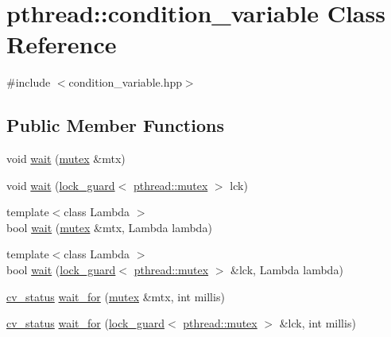 \hypertarget{classpthread_1_1condition__variable}{\section{pthread\+:\+:condition\+\_\+variable Class Reference}
\label{classpthread_1_1condition__variable}
}


{\ttfamily \#include $<$condition\+\_\+variable.\+hpp$>$}

\subsection*{Public Member Functions}
\begin{DoxyCompactItemize}
\item 
void \hyperlink{classpthread_1_1condition__variable_a34247dacb9da1856f3a65bc868b6abb8}{wait} (\hyperlink{classpthread_1_1mutex}{mutex} \&mtx)
\item 
void \hyperlink{classpthread_1_1condition__variable_a9bb3e49f17ec1470c305d8b21daadf2a}{wait} (\hyperlink{classpthread_1_1lock__guard}{lock\+\_\+guard}$<$ \hyperlink{classpthread_1_1mutex}{pthread\+::mutex} $>$ lck)
\item 
{\footnotesize template$<$class Lambda $>$ }\\bool \hyperlink{classpthread_1_1condition__variable_a251a506415355171be3052b68bc8d2ec}{wait} (\hyperlink{classpthread_1_1mutex}{mutex} \&mtx, Lambda lambda)
\item 
{\footnotesize template$<$class Lambda $>$ }\\bool \hyperlink{classpthread_1_1condition__variable_a7b6c075d1588178301547bc60c59ceba}{wait} (\hyperlink{classpthread_1_1lock__guard}{lock\+\_\+guard}$<$ \hyperlink{classpthread_1_1mutex}{pthread\+::mutex} $>$ \&lck, Lambda lambda)
\item 
\hyperlink{group__concurrency_ga823f88a2bf448bd5bd5273b826830bdd}{cv\+\_\+status} \hyperlink{classpthread_1_1condition__variable_a804a305eefb4da8abecd1e6326b82785}{wait\+\_\+for} (\hyperlink{classpthread_1_1mutex}{mutex} \&mtx, int millis)
\item 
\hyperlink{group__concurrency_ga823f88a2bf448bd5bd5273b826830bdd}{cv\+\_\+status} \hyperlink{classpthread_1_1condition__variable_a1dfcedf00e9822587c7b20da9c060fd9}{wait\+\_\+for} (\hyperlink{classpthread_1_1lock__guard}{lock\+\_\+guard}$<$ \hyperlink{classpthread_1_1mutex}{pthread\+::mutex} $>$ \&lck, int millis)
\item 

\end{DoxyCompactItemize}
